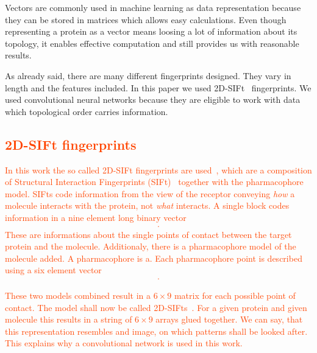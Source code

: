 \documentclass[a4paper,10pt]{report}
\newcommand{\igor}[1]{\textcolor{OrangeRed}{#1}}
\begin{document}
    
    Vectors are commonly used in machine learning as data representation because they can be stored in matrices which allows easy calculations. Even though representing a protein as a vector means loosing a lot of information about its topology, it enables effective computation and still provides us with reasonable results. 
    
    As already said, there are many different fingerprints designed. They vary in length and the features included. In this paper we used 2D-SIFt~\cite{2DSIFT} fingerprints. We used convolutional neural networks because they are eligible to work with data which topological order carries information.
     
     
    \igor{
    \section{2D-SIFt fingerprints} %
    In this work the so called 2D-SIFt fingerprints are used~\cite{Mordalski2011, cos-jeszcze}, which are a composition of Structural Interaction Fingerprints (SIFt)~\cite{Singh2006} together with the pharmacophore model. SIFts code information from the view of the receptor conveying \textit{how} a molecule interacts with the protein, not \textit{what} interacts. A single block codes information in a nine element long binary vector
    \begin{align*}
    [\text{any contact},&\text{backbone},\text{sidechain},\text{polar},\text{hydrophobic}, \\
    &\text{H-bond acceptor},\text{H-bond donor},\text{aromatic},\text{charged}
    ].
    \end{align*}
    These are informations about the single points of contact between the target protein and the molecule. Additionaly, there is a pharmacophore model of the molecule added. A pharmacophore is a\todo{opis farmakoforów}. Each pharmacophore point is described using a six element vector
    \begin{align*}
    [\text{H-bond donor},&\text{H-bond acceptor},\text{hydrophobic}, \\
    &\text{negatively charged},\text{positively charged},\text{aromatic}].
    \end{align*}
    }

    \igor{
    These two models combined result in a $6\times{}9$ matrix for each possible point of contact. The model shall now be called 2D-SIFts~\cite{Mordalski2011}. For a given protein and given molecule this results in a string of $6\times{}9$ arrays glued together. We can say, that this representation resembles and image, on which patterns shall be looked after. This explains why a convolutional network is used in this work.
	}
      
\end{document}
